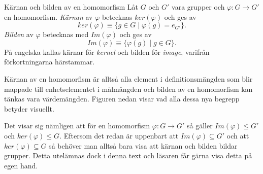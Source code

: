 \documentclass{article}
\theoremstyle{definition}
\begin{document}
\begin{mydef}{Kärnan och bilden av en homomorfism}{}
  Låt $G$ och $G'$ vara grupper och $\varphi : G \rightarrow G'$ en homomorfism.
  \textit{Kärnan} av $\varphi$ betecknas $ker(\varphi)$
  och ges av 
  \[ker(\varphi) \equiv \{g \in G \; | \; \varphi(g) = e_{G'}\}.\]
  \textit{Bilden} av $\varphi$ betecknas med $Im(\varphi)$ och ges av 
  \[Im(\varphi) \equiv \{\varphi(g) \; | \; g \in G\}.\]
  På engelska kallas kärnar för \textit{kernel} och bilden för \textit{image}, varifrån 
  förkortningarna härstammar.
\end{mydef}
Kärnan av en homomorfism är alltså alla element i definitionsmängden som blir mappade 
till enhetselementet i målmångden och bilden av en homomorfism kan tänkas vara värdemängden. 
Figuren nedan visar vad alla dessa nya begrepp betyder visuellt.
\begin{center}
\end{center}

Det visar sig nämligen att för en homomorfism $\varphi : G \rightarrow G'$ så gäller
$Im(\varphi) \le G'$ och $ker(\varphi) \le G$. Eftersom det redan är uppenbart att
$Im(\varphi) \subseteq G'$
och att $ker(\varphi) \subseteq G$ så behöver man alltså bara visa att kärnan och bilden bildar 
grupper. Detta utelämnas dock i denna text och läsaren får gärna visa detta på egen hand.
\end{document}

